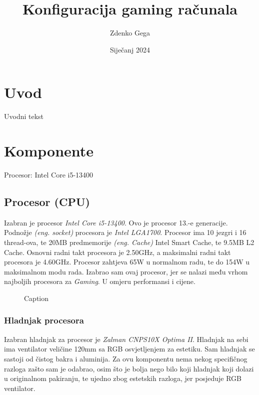 \documentclass{article}
\title{Konfiguracija gaming računala}
\author{Zdenko Gega}
\date{Siječanj 2024}
\begin{document}
\maketitle
\clearpage
\tableofcontents
\clearpage

\section{Uvod}
Uvodni tekst
\clearpage

\section{Komponente}
    Procesor: Intel Core i5-13400

    \subsection{Procesor (CPU)}
    Izabran je procesor \textit{Intel Core i5-13400}. Ovo je procesor 13.-e generacije. Podnožje \emph{(eng. socket)} procesora je \textit{Intel LGA1700}. Procesor ima 10 jezgri i 16 thread-ova, te 20MB predmemorije \emph{(eng. Cache)} Intel Smart Cache, te 9.5MB L2 Cache. Osnovni radni takt procesora je 2.50GHz, a maksimalni radni takt procesora je 4.60GHz. Procesor zahtjeva 65W u normalnom radu, te do 154W u maksimalnom modu rada. Izabrao sam ovaj procesor, jer se nalazi među vrhom najboljih procesora za \textit{Gaming}. U omjeru performansi i cijene.

    \begin{figure}[H]
        \centering
        \caption{Caption}
        \label{fig:Procesor}
    \end{figure}
    \subsubsection{Hladnjak procesora}
    Izabran hladnjak za procesor je \textit{Zalman CNPS10X Optima II}. Hladnjak na sebi ima ventilator veličine 120mm sa RGB osvjetljenjem za estetiku. Sam hladnjak se sastoji od čistog bakra i aluminija. Za ovu komponentu nema nekog specifičnog razloga zašto sam je odabrao, osim što je bolja nego bilo koji hladnjak koji dolazi u originalnom pakiranju, te ujedno zbog estetskih razloga, jer posjeduje RGB ventilator.

    \clearpage
\end{document}
